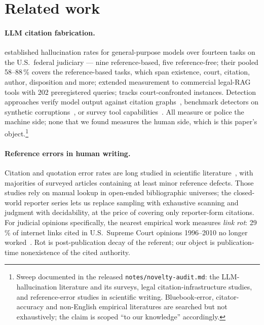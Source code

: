 \documentclass[11pt,a4paper]{article}
\begin{document}
\section{Related work}\label{sec:related}

\paragraph{LLM citation fabrication.} \citet{dahl2024} established
hallucination rates for general-purpose models over fourteen tasks on
the U.S.\ federal judiciary --- nine reference-based, five
reference-free; their pooled 58--88\,\% covers the reference-based
tasks, which span existence, court, citation, author, disposition and
more; \citet{magesh2024} extended measurement to commercial legal-RAG
tools with 202 preregistered queries; \citet{charlotin2026} tracks
court-confronted instances. Detection approaches verify model output
against citation graphs~\citep{ovcharov2026ukraine}, benchmark
detectors on synthetic corruptions~\citep{legalcitebench2026}, or
survey tool capabilities~\citep{citetools2026}. All measure or police
the machine side; none that we found measures the human side, which is
this paper's object.\footnote{Sweep documented in the released
\texttt{notes/novelty-audit.md}: the LLM-hallucination literature and
its surveys, legal citation-infrastructure studies, and
reference-error studies in scientific writing. Bluebook-error,
citator-accuracy and non-English empirical literatures are searched
but not exhaustively; the claim is scoped ``to our knowledge''
accordingly.}

\paragraph{Reference errors in human writing.} Citation and quotation
error rates are long studied in scientific
literature~\citep{quotationerr}, with majorities of surveyed articles
containing at least minor reference defects. Those studies rely on
manual lookup in open-ended bibliographic universes; the closed-world
reporter series lets us replace sampling with exhaustive scanning and
judgment with decidability, at the price of covering only
reporter-form citations. For judicial opinions specifically, the
nearest empirical work measures \emph{link rot}: 29\,\% of internet
links cited in U.S.\ Supreme Court opinions 1996--2010 no longer
worked~\citep{liebler2013}. Rot is post-publication decay of the
referent; our object is publication-time nonexistence of the cited
authority.
\end{document}
